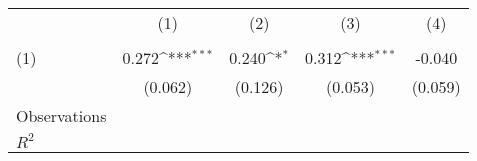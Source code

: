 {
\def\sym#1{\ifmmode^{#1}\else\(^{#1}\)\fi}
\begin{tabular}{l*{4}{c}}
\hline\hline
                    &\multicolumn{1}{c}{(1)}&\multicolumn{1}{c}{(2)}&\multicolumn{1}{c}{(3)}&\multicolumn{1}{c}{(4)}\\
                    &\multicolumn{1}{c}{} &\multicolumn{1}{c}{} &\multicolumn{1}{c}{} &\multicolumn{1}{c}{} \\
\hline
(1)                 &       0.272\sym{***}&       0.240\sym{*}  &       0.312\sym{***}&      -0.040         \\
                    &     (0.062)         &     (0.126)         &     (0.053)         &     (0.059)         \\
\hline
Observations        &                     &                     &                     &                     \\
\(R^{2}\)           &                     &                     &                     &                     \\
\hline\hline
\end{tabular}
}
